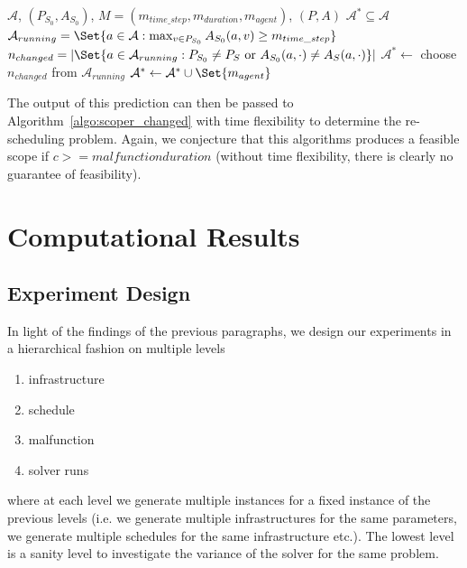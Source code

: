 \documentclass{article}
\begin{document}
\begin{algorithm}
	\caption{$changed\_random$} \label{algo:scoper_random}
	\begin{algorithmic}[1]
		\Require $\mathcal{A}$, $(P_{S_0},A_{S_0})$, $M=(m_{time\_step},m_{duration},m_{agent})$, $(P,A)$
	    \Ensure $\mathcal{A}^* \subseteq \mathcal{A}$
	    \State $\mathcal{A}_{running}=\Set{a \in \mathcal{A}: \max_{v \in P_{S_0}} A_{S_0}(a,v) \geq m_{time\_step}}$
	    \State $n_{changed} = \left| \Set{a\in \mathcal{A}_{running}:  P_{S_0} \not=P_{S} \textrm { or } A_{S_0}(a,\cdot) \not= A_{S}(a,\cdot)} \right|$
	    \State $\mathcal{A}^* \leftarrow$ choose $n_{changed}$ from $\mathcal{A}_{running}$
	    \State $\mathcal{A}^* \leftarrow \mathcal{A}^* \cup \Set{m_{agent}}$
	\end{algorithmic}
\end{algorithm}
The output of this prediction can then be passed to Algorithm~\ref{algo:scoper_changed} with time flexibility to determine the re-scheduling problem.
Again, we conjecture that this algorithms produces a feasible scope if $c >= malfunction duration$ (without time flexibility, there is clearly no guarantee of feasibility).


\section{Computational Results}\label{sec:Results}




\subsection{Experiment Design}

In light of the findings of the previous paragraphs, we design our experiments in a hierarchical fashion on multiple levels
\begin{enumerate}
    \item infrastructure
    \item schedule
    \item malfunction
    \item solver runs
\end{enumerate}
where at each level we generate multiple instances for a fixed instance of the previous levels (i.e. we generate multiple infrastructures for the same parameters, we generate multiple schedules for the same infrastructure etc.). The lowest level is a sanity level to investigate the variance of the solver for the same problem.
\end{document}
